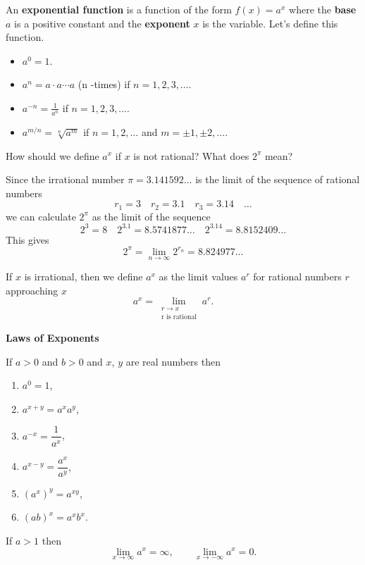 \documentclass[../main.tex]{subfiles}
\begin{document}
  An \textbf{exponential function} is a function of the form $f(x) = a^x$ where the \textbf{base} $a$ is a positive constant and the \textbf{exponent} $x$ is the variable. Let's define this function.

  \begin{itemize}
    \item $a^0 = 1$.
    \item $a^n = a \cdot a \cdots a$ (n -times) if $n = 1, 2, 3, \dots$.
    \item $a^{-n} = \frac{1}{a^n}$ if $n=1, 2, 3, \dots$.
    \item $a^{m/n} = \sqrt[n]{a^m}$ if $n=1, 2, \dots$ and $m = \pm 1, \pm 2, \dots$.
  \end{itemize}

  How should we define $a^x$ if $x$ is not rational? What does $2^{\pi}$ mean?

  \begin{example}
    Since the irrational number $\pi = 3.141592\dots$ is the limit of the sequence of rational numbers
    \[
      r_1 = 3 \quad r_2 = 3.1 \quad r_3 = 3.14 \quad \dots
    \]
    we can calculate $2^{\pi}$ as the limit of the sequence
    \[
      2^3 = 8 \quad 2^{3.1} = 8.5741877\dots \quad 2^{3.14} = 8.8152409\dots
    \]
    This gives
    \[
      2^{\pi} = \lim_{n \to \infty} 2^{r_n} = 8.824977\dots
    \]
  \end{example}
  If $x$ is irrational, then we define $a^x$ as the limit values $a^r$ for rational numbers $r$ approaching $x$
  \[
    a^x = \lim_{\substack{r \to x \\ \text{r is rational}}} a^r. \qquad
  \]

  \textbf{Laws of Exponents}

  If $a>0$ and $b>0$ and $x$, $y$ are real numbers then
  \begin{multicols}{2}
    \begin{enumerate}
      \item $a^{0} = 1$,
      \item $a^{x+y} = a^x a^y$,
      \item $a^{-x} = \dfrac{1}{a^x}$,
      \item $a^{x-y} = \dfrac{a^x}{a^y}$,
      \item $(a^x)^y = a^{xy}$,
      \item $(ab)^x = a^x b^x$.
    \end{enumerate}
  \end{multicols}

  If $a>1$ then
  \[
    \lim_{x \to \infty} a^x = \infty, \qquad
    \lim_{x \to -\infty} a^x = 0.
  \]
\end{document}
